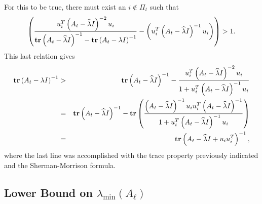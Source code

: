\documentclass[final,leqno,onefignum,onetabnum]{siamltex1213}
\begin{document}
For this to be true, there must exist an $i\not\in \Pi_t$ such that
\[{\displaystyle  \left(\frac{u_i^T\left(A_t-\widehat{\lambda}I\right)^{-2}u_i}{\text{\bf tr}\left(A_t-\widehat{\lambda}I\right)^{-1}-\text{\bf tr}\left(A_t-\lambda I\right)^{-1}}-\left(u_i^T\left(A_t-\widehat{\lambda}I\right)^{-1}u_i\right)\right) > 1.} \]
This last relation gives
\begin{eqnarray*}
{\displaystyle  \text{\bf tr}\left(A_t-\lambda I\right)^{-1}} &>&{\displaystyle   \text{\bf tr}\left(A_t-\widehat{\lambda}I\right)^{-1}-\frac{u_i^T\left(A_t-\widehat{\lambda}I\right)^{-2}u_i}{1+u_i^T\left(A_t-\widehat{\lambda}I\right)^{-1}u_i}} \\
&=&{\displaystyle  \text{\bf tr}\left(A_t-\widehat{\lambda}I\right)^{-1}-\text{\bf tr}\left(\frac{\left(A_t-\widehat{\lambda}I\right)^{-1}u_iu_i^T\left(A_t-\widehat{\lambda}I\right)^{-1}}{1+u_i^T\left(A_t-\widehat{\lambda}I\right)^{-1}u_i}\right)} \\
&=&{\displaystyle  \text{\bf tr}\left(A_t-\widehat{\lambda}I+u_iu_i^T\right)^{-1}, }
\end{eqnarray*}
where the last line was accomplished with the trace property previously indicated and the Sherman-Morrison formula.
\hspace{2 em}\endproof

\subsection{Lower Bound on $\lambda_{\min}(A_{\ell})$}\label{sec:32}
\end{document}
